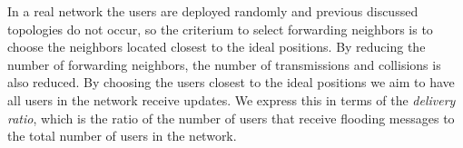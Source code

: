 In a real network the users are deployed randomly and previous discussed topologies do not occur, so the criterium to select forwarding neighbors is to choose the neighbors located closest to the ideal positions. By reducing the number of forwarding neighbors, the number of transmissions and collisions is also reduced. By choosing the users closest to the ideal positions we aim to have all users in the network receive updates. We express this in terms of the \textit{delivery ratio}, which is the ratio of the number of users that receive flooding messages to the total number of users in the network.

\begin{figure}
\centering
{} \hspace{8mm}

\end{figure}
